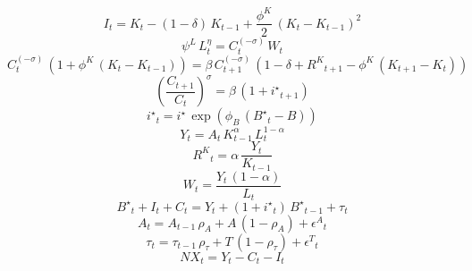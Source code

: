 \noindent[name= `Ley de acumuluación del capital']
\begin{dmath}
{I}_{t}={K}_{t}-\left(1-{\delta}\right)\, {K}_{t-1}+\frac{{\phi^{K}}}{2}\, \left({K}_{t}-{K}_{t-1}\right)^{2}
\end{dmath}
\noindent[name= `Oferta de trabajo']
\begin{dmath}
{\psi^L}\, {L}_{t}^{{\eta}}={C}_{t}^{\left(-{\sigma}\right)}\, {W}_{t}
\end{dmath}
\noindent[name= `Ecuación de Euler']
\begin{dmath}
{C}_{t}^{\left(-{\sigma}\right)}\, \left(1+{\phi^{K}}\, \left({K}_{t}-{K}_{t-1}\right)\right)={\beta}\, {C}_{t+1}^{\left(-{\sigma}\right)}\, \left(1-{\delta}+{R^{K}}_{t+1}-{\phi^{K}}\, \left({K}_{t+1}-{K}_{t}\right)\right)
\end{dmath}
\noindent[name= `Demanda de bonos']
\begin{dmath}
\left(\frac{{C}_{t+1}}{{C}_{t}}\right)^{{\sigma}}={\beta}\, \left(1+{i^{\star}}_{t+1}\right)
\end{dmath}
\noindent[name= `Tasa de interés de la deuda']
\begin{dmath}
{i^{\star}}_{t}={i^{\star}}\, \exp\left({\phi_{B}}\, \left({B^{\star}}_{t}-{B}\right)\right)
\end{dmath}
\noindent[name= `Función de producción']
\begin{dmath}
{Y}_{t}={A}_{t}\, {K}_{t-1}^{{\alpha}}\, {L}_{t}^{1-{\alpha}}
\end{dmath}
\noindent[name= `Demanda de capital']
\begin{dmath}
{R^{K}}_{t}={\alpha}\, \frac{{Y}_{t}}{{K}_{t-1}}
\end{dmath}
\noindent[name= `Demanda de trabajo']
\begin{dmath}
{W}_{t}=\frac{{Y}_{t}\, \left(1-{\alpha}\right)}{{L}_{t}}
\end{dmath}
\noindent[name= `Demanda agregada']
\begin{dmath}
{B^{\star}}_{t}+{I}_{t}+{C}_{t}={Y}_{t}+\left(1+{i^{\star}}_{t}\right)\, {B^{\star}}_{t-1}+{\tau}_{t}
\end{dmath}
\noindent[name= `Productividad']
\begin{dmath}
{A}_{t}={A}_{t-1}\, {\rho_{A}}+{A}\, \left(1-{\rho_{A}}\right)+{\epsilon^{A}}_{t}
\end{dmath}
\noindent[name= `Transferencias']
\begin{dmath}
{\tau}_{t}={\tau}_{t-1}\, {\rho_{\tau}}+{T}\, \left(1-{\rho_{\tau}}\right)+{\epsilon^{T}}_{t}
\end{dmath}
\noindent[name= `Exportaciones netas']
\begin{dmath}
{NX}_{t}={Y}_{t}-{C}_{t}-{I}_{t}
\end{dmath}
